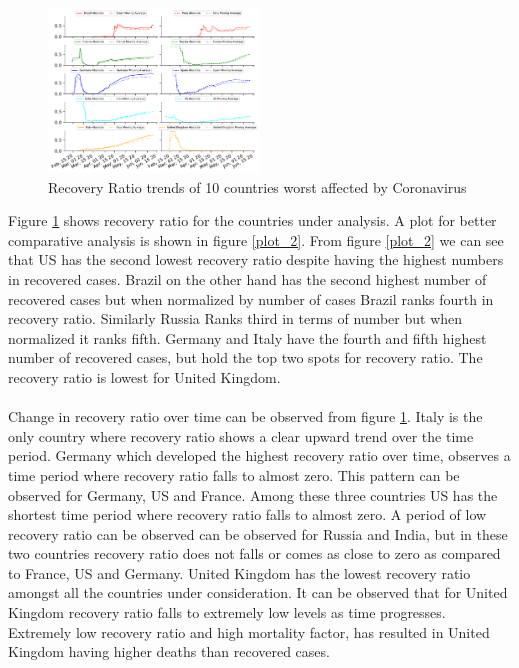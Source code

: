 \documentclass[12pt, twosided]{report}  %
\begin{document}
\begin{figure}[H]
	\centering
	\includegraphics[width=0.5\textwidth]{./images/plot_5.pdf}
	\caption{Recovery Ratio trends of 10 countries worst affected by Coronavirus}
	\label{plot_recoveryratio}
\end{figure} 

Figure \ref{plot_recoveryratio} shows recovery ratio for the countries under analysis. A plot for better comparative analysis is shown in figure \ref{plot_2}. From figure \ref{plot_2} we can see that US has the second lowest recovery ratio despite having the highest numbers in recovered cases. Brazil on the other hand has the second highest number of recovered cases but when normalized by number of cases Brazil ranks fourth in recovery ratio. Similarly Russia Ranks third in terms of number but when normalized it ranks fifth. Germany and Italy have the fourth and fifth highest number of recovered cases, but hold the top two spots for recovery ratio. The recovery ratio is lowest for United Kingdom.
\\
\\
Change in recovery ratio over time can be observed from figure \ref{plot_recoveryratio}. Italy is the only country where recovery ratio shows a clear upward trend over the time period. Germany which developed the highest recovery ratio over time, observes a time period where recovery ratio falls to almost zero. This pattern can be observed for Germany, US and France. Among these three countries US has the shortest time period where recovery ratio falls to almost zero. A period of low recovery ratio can be observed can be observed for Russia and India, but in these two countries recovery ratio does not falls or comes as close to zero as compared to France, US and Germany. United Kingdom has the lowest recovery ratio amongst all the countries under consideration. It can be observed that for United Kingdom recovery ratio falls to extremely low levels as time progresses. Extremely low recovery ratio and high mortality factor, has resulted in United Kingdom having higher deaths than recovered cases.
\end{document}
